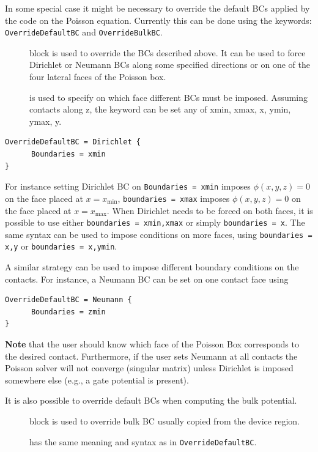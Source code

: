 In some special case it might be necessary to override the default BCs applied
by the code on the Poisson equation. Currently this can be done using the
keywords: \verb|OverrideDefaultBC| and \verb|OverrideBulkBC|.

\begin{description}
\item[] block is used to override the BCs described
  above. It can be used to force Dirichlet or Neumann BCs along some specified
  directions or on one of the four lateral faces of the Poisson box.
\item[] is used to specify on which face different BCs must be
  imposed. Assuming contacts along z, the keyword can be set any of xmin, xmax,
  x, ymin, ymax, y.
\end{description}

\begin{verbatim}
OverrideDefaultBC = Dirichlet {
      Boundaries = xmin   
}
\end{verbatim}

For instance setting Dirichlet BC on \verb|Boundaries = xmin| imposes
$\phi(x,y,z)=0$ on the face placed at $x=x_{\text{min}}$,
\verb|boundaries = xmax| imposes $\phi(x,y,z)=0$ on the face placed at
$x=x_{\text{max}}$. When Dirichlet needs to be forced on both faces, it is
possible to use either \verb|boundaries = xmin,xmax| or simply
\verb|boundaries = x|. The same syntax can be used to impose conditions on more
faces, using \verb|boundaries = x,y| or \verb|boundaries = x,ymin|.

A similar strategy can be used to impose different boundary conditions on the
contacts. For instance, a Neumann BC can be set on one contact face using

\begin{verbatim}
OverrideDefaultBC = Neumann {
      Boundaries = zmin   
}
\end{verbatim}

{\bf Note} that the user should know which face of the Poisson Box corresponds
to the desired contact. Furthermore, if the user sets Neumann at all contacts
the Poisson solver will not converge (singular matrix) unless Dirichlet is
imposed somewhere else (e.g., a gate potential is present).

It is also possible to override default BCs when computing the bulk potential.

\begin{description}
\item[] block is used to override bulk BC usually copied from
  the device region.
\item[] has the same meaning and syntax as in
  \verb|OverrideDefaultBC|.
\end{description}


